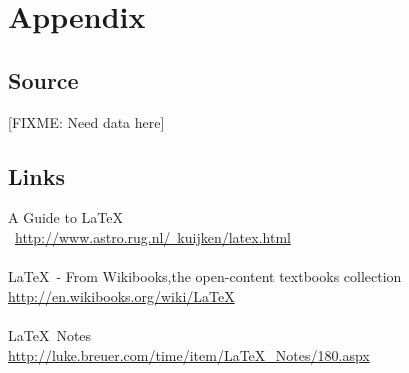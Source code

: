 \documentclass[12pt,letterpaper,dvips]{article}
\newcommand{\FIXME}[1]{\textsf{[FIXME: #1]}}
\begin{document}
\setcounter{secnumdepth}{0}
\section{Appendix}


\subsection{Source}
\FIXME{Need data here}


\subsection{Links}
A Guide to \LaTeX\\\
\href{http://www.astro.rug.nl/~kuijken/latex.html}
{http://www.astro.rug.nl/~kuijken/latex.html}
\\
\\
\LaTeX\ - From Wikibooks,the open-content textbooks collection\\
\href{http://en.wikibooks.org/wiki/LaTeX}{http://en.wikibooks.org/wiki/LaTeX}
\\
\\
\LaTeX\ Notes\\
\href{http://luke.breuer.com/time/item/LaTeX\_Notes/180.aspx}{http://luke.breuer.com/time/item/LaTeX\_Notes/180.aspx}
\end{document}
